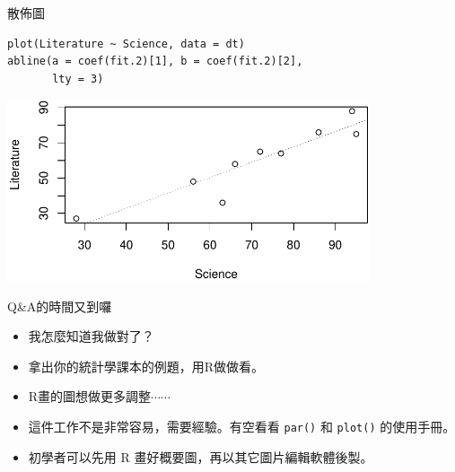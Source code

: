 \documentclass[12pt, aspectratio=43]{beamer}
\begin{document}
\begin{frame}[fragile]{散佈圖}

\begin{verbatim}
plot(Literature ~ Science, data = dt)
abline(a = coef(fit.2)[1], b = coef(fit.2)[2],
       lty = 3)
\end{verbatim}

\begin{center}
\includegraphics[width=0.8\textwidth]{Rplot-sct.pdf}
\end{center}
\end{frame}

%







\begin{frame}[fragile]{Q\&A的時間又到囉}
\begin{itemize}
\item[Q] 我怎麼知道我做對了？
\item[A] 拿出你的統計學課本的例題，用R做做看。
\end{itemize}
\begin{itemize}\item[Q] R畫的圖想做更多調整$\cdots\cdots$
\item[A1] 這件工作不是非常容易，需要經驗。有空看看 \verb+par()+ 和 \verb+plot()+ 的使用手冊。
\item[A2] 初學者可以先用 R 畫好概要圖，再以其它圖片編輯軟體後製。
\end{itemize}
\end{frame}
\end{document}
